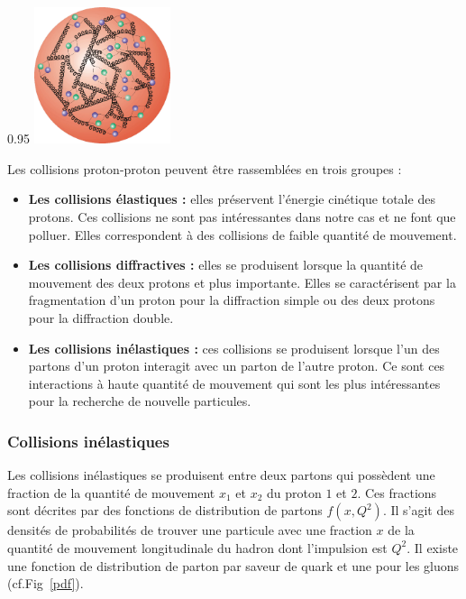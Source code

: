 \begin{minipagewithmarginpars}[ht!]{0.95\textwidth}
\centering
\includegraphics[width=0.3\textwidth]{SM/quarks3.png}
\label{proton}	
\end{minipagewithmarginpars}

Les collisions proton-proton peuvent être rassemblées en trois groupes :
\begin{itemize}[label=$\bullet$]
	\item \textbf{Les collisions élastiques : } elles préservent l'énergie cinétique totale des protons. Ces collisions ne sont pas intéressantes dans notre cas et ne font que polluer. Elles correspondent à des collisions de faible quantité de mouvement.
	\item\textbf{Les collisions diffractives : } elles se produisent lorsque la quantité de mouvement des deux protons et plus importante. Elles se caractérisent par la fragmentation d'un proton pour la diffraction simple ou des deux protons pour la diffraction double.
	\item \textbf{Les collisions inélastiques : } ces collisions se produisent lorsque l'un des partons d'un proton interagit avec un parton de l'autre proton. Ce sont ces interactions à haute quantité de mouvement qui sont les plus intéressantes pour la recherche de nouvelle particules.
\end{itemize}

\subsubsection{Collisions inélastiques}
Les collisions inélastiques se produisent entre deux partons qui possèdent une fraction de la quantité de mouvement $x_{1}$ et $x_{2}$ du proton $1$ et $2$. Ces fractions sont décrites par des fonctions de distribution de partons $f(x,Q^{2})$. Il s'agit des densités de probabilités de trouver une particule avec une fraction $x$ de la quantité de mouvement longitudinale du hadron dont l'impulsion est $Q^{2}$. Il existe une fonction de distribution de parton par saveur de quark et une pour les gluons (cf.Fig~\ref{pdf}).

